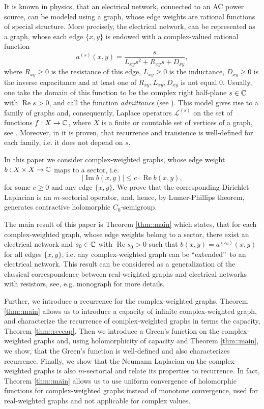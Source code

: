 \documentclass[a4paper,11pt]{amsart}
\theoremstyle{definition}
\renewcommand{\a}{a}%
\renewcommand{\Re}{\operatorname{Re}}%
\renewcommand{\Im}{\operatorname{Im}}%
\renewcommand{\L}{\mathcal{L}}
\newcommand{\cfreq}{s}
\begin{document}
It is known in physics, that an electrical network, connected to an AC power source, can be modeled using a graph, whose edge weights are rational functions of special structure. More precisely,
the electrical network, can be represented as a graph, whose each edge $\{x,y\}$  is endowed with a complex-valued rational function
\begin{equation*}
\a^{(\cfreq)}(x,y)=\dfrac{\cfreq}{L_{xy}\cfreq^2 +R_{xy}\cfreq+D_{xy} },
\end{equation*}
 where $R_{xy}\ge 0$ is the
resistance of this edge, $L_{xy}\ge 0$ is the inductance, $D_{xy}\ge 0$ is the inverse
capacitance and at least one of $R_{xy},L _{xy}, D_{xy}$ is not equal $0$. Usually, one take the domain of this function to be the complex right half-plane $\cfreq\in \Bbb C$ with $\Re \cfreq>0$,
and call the function {\em admittance} (see \cite{Brune, ChenTeplyaev, Feynman, Muranova3, Muranova1, MuranovaWoess}). This model gives rise to a family of graphs and, consequently, Laplace operators  $\L^{(\cfreq)}$ on the set of functions $f: X\to \Bbb C$, where $X$ is a finite or countable set of vertices  of a graph, see \cite{Muranova3, Muranova1}. Moreover, in \cite{MuranovaWoess} it is proven, that recurrence and transience is well-defined for each family, i.e. it does not depend on $\cfreq$.

In this paper we consider complex-weighted graphs, whose edge weight $b: X\times X\to \Bbb C$ maps to a sector, i.e.
$$
|\Im b(x,y)|\le c\cdot \Re b(x,y),
$$ 
for some $c\ge 0$ and any edge $\{x,y\}$. 
We prove that the corresponding Dirichlet Laplacian is an $m$-sectorial operator, and, hence, by Lumer-Phillips theorem, generates  contractive holomorphic $C_0$-semigroup. 

The main result of this paper is Theorem \ref{thm::main} which states, that for each  complex-weighted graph, whose edge weights belong to a sector, there exist an electrical network and $\cfreq_0\in \Bbb C$ with $\Re \cfreq_0>0$ such that  $b(x,y)=\a^{(\cfreq_0)}(x,y)$ for all edges $\{x,y\}$, i.e. any complex-weighted graph can be ``extended''~to an electrical network. This result can be considered as a generalization of the classical correspondence between real-weighted graphs and electrical networks with resistors, see, e.g. monograph \cite{DoyleSnell} for more details. 

Further, we introduce a recurrence for the complex-weighted graphs. Theorem \ref{thm::main} allows us to introduce a capacity of infinite complex-weighted graph,  and characterize the recurrence of complex-weighted graphs in terms  the capacity, Theorem \ref{thm::reccap}. Then we introduce a Green's function on the complex-weighted graphs and, using holomorphicity of capacity and Theorem \ref{thm::main}, we show, that the Green's function is well-defined and also characterizes recurrence. Finally, we show that the Neumann Laplacian on the complex-weighted graphs is also $m$-sectorial and relate its properties to recurrence. In fact, Theorem \ref{thm::main}  allows us to use uniform convergence of holomorphic functions for complex-weighted graphs instead of monotone convergence, used for real-weighted graphs and not applicable for complex values. 
\end{document}
